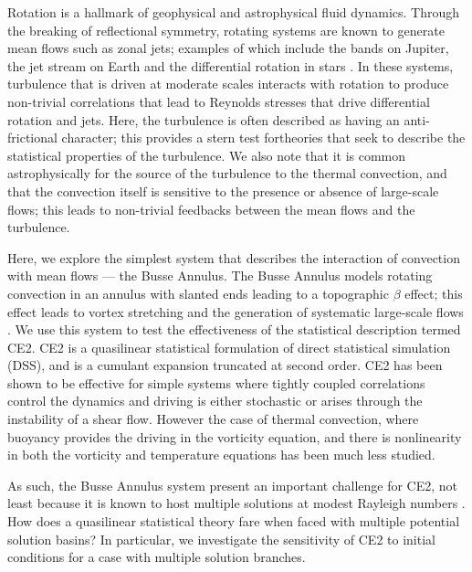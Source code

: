 \documentclass{jfm}
\begin{document}
Rotation is a hallmark of geophysical and astrophysical fluid dynamics.
Through the breaking of reflectional symmetry, rotating systems are known to generate mean flows such as zonal jets; examples of which include the bands on Jupiter, the jet stream on Earth and the differential rotation in stars \citep{galperin_read_2019}.
In these systems, turbulence that is driven at moderate scales interacts with rotation to produce non-trivial correlations that lead to Reynolds stresses that drive differential rotation and jets. Here, the turbulence is often described as having an anti-frictional character; this provides a stern test fortheories that seek to describe the statistical properties of the turbulence. We also note that it is common astrophysically for the source of the turbulence to the thermal convection, and that the convection itself is sensitive to the presence or absence of large-scale flows; this leads to non-trivial feedbacks between the mean flows and the turbulence.


Here, we explore the simplest system that describes the interaction of convection with mean flows --- the Busse Annulus. The Busse Annulus models rotating convection in an annulus with slanted ends leading to a topographic $\beta$ effect; this effect leads to vortex stretching and the generation of systematic large-scale flows 
\citep[see e.g.][]{1976Icar...29..255B,bh1993,rj2006}. We use this system to test the effectiveness of the statistical description termed CE2. CE2 is a quasilinear statistical formulation of direct statistical simulation (DSS), and is a cumulant expansion truncated at second order. CE2 has been shown to be effective for simple systems where tightly coupled correlations control the dynamics and driving is either stochastic or arises through the instability of a shear flow. However the case of thermal convection, where buoyancy provides the driving in the vorticity equation, and there is nonlinearity in both the vorticity and temperature equations has been much less studied. 




As such, the Busse Annulus system present an important challenge for CE2, not least because it is known to host multiple solutions at modest Rayleigh numbers \citep{bh1993}.
How does a quasilinear statistical theory fare when faced with multiple potential solution basins?
In particular, we investigate the sensitivity of CE2 to initial conditions for a case with multiple solution branches.
\end{document}
